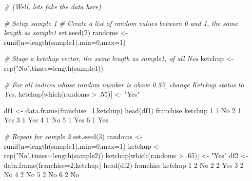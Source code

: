 \documentclass[
]{book}
\newenvironment{Shaded}{\begin{snugshade}}{\end{snugshade}}
\newcommand{\AttributeTok}[1]{\textcolor[rgb]{0.77,0.63,0.00}{#1}}
\newcommand{\CommentTok}[1]{\textcolor[rgb]{0.56,0.35,0.01}{\textit{#1}}}
\newcommand{\DecValTok}[1]{\textcolor[rgb]{0.00,0.00,0.81}{#1}}
\newcommand{\FunctionTok}[1]{\textcolor[rgb]{0.00,0.00,0.00}{#1}}
\newcommand{\NormalTok}[1]{#1}
\newcommand{\OtherTok}[1]{\textcolor[rgb]{0.56,0.35,0.01}{#1}}
\newcommand{\SpecialCharTok}[1]{\textcolor[rgb]{0.00,0.00,0.00}{#1}}
\newcommand{\StringTok}[1]{\textcolor[rgb]{0.31,0.60,0.02}{#1}}
\begin{document}
\begin{Shaded}
\begin{Highlighting}[]
\CommentTok{\# (Well, let\textquotesingle{}s fake the data here)}

\CommentTok{\# Setup sample 1}
\CommentTok{\# Create a list of random values between 0 and 1, the same length as sample1}
\FunctionTok{set.seed}\NormalTok{(}\DecValTok{2}\NormalTok{)}
\NormalTok{randoms }\OtherTok{\textless{}{-}} \FunctionTok{runif}\NormalTok{(}\AttributeTok{n=}\FunctionTok{length}\NormalTok{(sample1),}\AttributeTok{min=}\DecValTok{0}\NormalTok{,}\AttributeTok{max=}\DecValTok{1}\NormalTok{)}

\CommentTok{\# Stage a \textasciigrave{}ketchup\textasciigrave{} vector, the same length as sample1, of all No\textquotesingle{}s}
\NormalTok{ketchup }\OtherTok{\textless{}{-}} \FunctionTok{rep}\NormalTok{(}\StringTok{"No"}\NormalTok{,}\AttributeTok{times=}\FunctionTok{length}\NormalTok{(sample1))}

\CommentTok{\# For all indices whose random number is above 0.55, change Ketchup status to Yes.}
\NormalTok{ketchup[}\FunctionTok{which}\NormalTok{(randoms }\SpecialCharTok{\textgreater{}}\NormalTok{ .}\DecValTok{55}\NormalTok{)] }\OtherTok{\textless{}{-}} \StringTok{"Yes"}

\NormalTok{df1 }\OtherTok{\textless{}{-}} \FunctionTok{data.frame}\NormalTok{(}\AttributeTok{franchise=}\DecValTok{1}\NormalTok{,ketchup)}
\FunctionTok{head}\NormalTok{(df1)}
\NormalTok{  franchise ketchup}
\DecValTok{1}         \DecValTok{1}\NormalTok{      No}
\DecValTok{2}         \DecValTok{1}\NormalTok{     Yes}
\DecValTok{3}         \DecValTok{1}\NormalTok{     Yes}
\DecValTok{4}         \DecValTok{1}\NormalTok{      No}
\DecValTok{5}         \DecValTok{1}\NormalTok{     Yes}
\DecValTok{6}         \DecValTok{1}\NormalTok{     Yes}

\CommentTok{\# Repeat for sample 2}
\FunctionTok{set.seed}\NormalTok{(}\DecValTok{3}\NormalTok{)}
\NormalTok{randoms }\OtherTok{\textless{}{-}} \FunctionTok{runif}\NormalTok{(}\AttributeTok{n=}\FunctionTok{length}\NormalTok{(sample1),}\AttributeTok{min=}\DecValTok{0}\NormalTok{,}\AttributeTok{max=}\DecValTok{1}\NormalTok{)}
\NormalTok{ketchup }\OtherTok{\textless{}{-}} \FunctionTok{rep}\NormalTok{(}\StringTok{"No"}\NormalTok{,}\AttributeTok{times=}\FunctionTok{length}\NormalTok{(sample2))}
\NormalTok{ketchup[}\FunctionTok{which}\NormalTok{(randoms }\SpecialCharTok{\textgreater{}}\NormalTok{ .}\DecValTok{65}\NormalTok{)] }\OtherTok{\textless{}{-}} \StringTok{"Yes"}
\NormalTok{df2 }\OtherTok{\textless{}{-}} \FunctionTok{data.frame}\NormalTok{(}\AttributeTok{franchise=}\DecValTok{2}\NormalTok{,ketchup)}
\FunctionTok{head}\NormalTok{(df2)}
\NormalTok{  franchise ketchup}
\DecValTok{1}         \DecValTok{2}\NormalTok{      No}
\DecValTok{2}         \DecValTok{2}\NormalTok{     Yes}
\DecValTok{3}         \DecValTok{2}\NormalTok{      No}
\DecValTok{4}         \DecValTok{2}\NormalTok{      No}
\DecValTok{5}         \DecValTok{2}\NormalTok{      No}
\DecValTok{6}         \DecValTok{2}\NormalTok{      No}


\end{Highlighting}
\end{Shaded}
\end{document}
